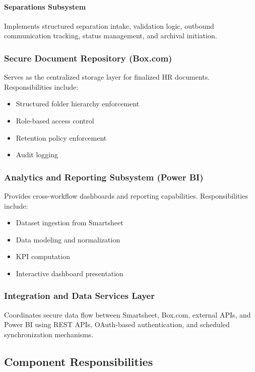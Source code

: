\documentclass[12pt]{article}
\begin{document}
\paragraph{Separations Subsystem}
Implements structured separation intake, validation logic, outbound communication tracking, status management, and archival initiation.

\subsubsection{Secure Document Repository (Box.com)}

Serves as the centralized storage layer for finalized HR documents. Responsibilities include:

\begin{itemize}
    \item Structured folder hierarchy enforcement
    \item Role-based access control
    \item Retention policy enforcement
    \item Audit logging
\end{itemize}

\subsubsection{Analytics and Reporting Subsystem (Power BI)}

Provides cross-workflow dashboards and reporting capabilities. Responsibilities include:

\begin{itemize}
    \item Dataset ingestion from Smartsheet
    \item Data modeling and normalization
    \item KPI computation
    \item Interactive dashboard presentation
\end{itemize}

\subsubsection{Integration and Data Services Layer}

Coordinates secure data flow between Smartsheet, Box.com, external APIs, and Power BI using REST APIs, OAuth-based authentication, and scheduled synchronization mechanisms.

\subsection{Component Responsibilities}
\end{document}
